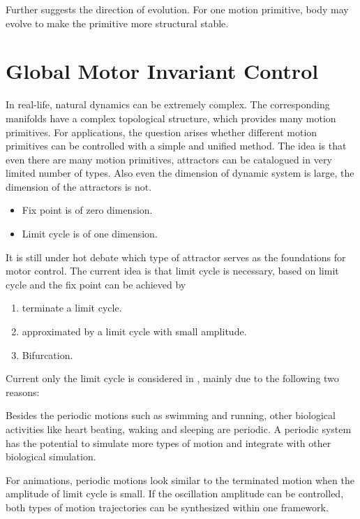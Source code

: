 Further \moit suggests the direction of evolution.
For one motion primitive, body may evolve to make the primitive more structural stable.






\section{Global Motor Invariant Control}
\label{sec:cpgcontrol}

In real-life,  natural dynamics can be extremely complex. 
The corresponding manifolds have a complex topological structure, which provides many motion primitives.
For \cms applications, the question arises whether different motion primitives can be controlled with a simple and unified method.
The idea is that even there are many motion primitives, attractors can be catalogued in very limited number of types. 
Also even the dimension of dynamic system is large, the dimension of the attractors is not. 
\begin{itemize}
\item Fix point is of zero dimension. 
\item Limit cycle is of one dimension.
\end{itemize}



It is  still under hot debate which type of attractor serves as the foundations for motor control\citep{Degallier2010}.
The current idea is that limit cycle is necessary, based on limit cycle and the fix point can be achieved by
\begin{enumerate} 
\item terminate a limit cycle. 
\item approximated by a limit cycle with small amplitude.
\item Bifurcation. 
\end{enumerate}


Current only the limit cycle is considered in \moit, mainly due to the following two reasons:
\begin{itemize}
Besides the periodic motions such as swimming and running, other biological activities like heart beating, waking and sleeping  are periodic.
A periodic system has the potential to simulate more types of motion and integrate with other biological simulation.

For animations, periodic motions look similar to the terminated motion when the amplitude of limit cycle is small. 
If the oscillation amplitude can be controlled, both types of motion trajectories can be synthesized within one framework.
\end{itemize}

